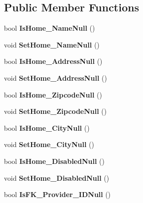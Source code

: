 \subsection*{Public Member Functions}
\begin{DoxyCompactItemize}
\item 
\mbox{\label{class_a_f_h___scheduler_1_1_home_inspection_db_data_set_1_1_home_row_ad3791247dcb190cc82cf0a80340b1a56}} 
bool {\bfseries Is\+Home\+\_\+\+Name\+Null} ()
\item 
\mbox{\label{class_a_f_h___scheduler_1_1_home_inspection_db_data_set_1_1_home_row_a62ccb79bfed5378f59b8f469e11d7f36}} 
void {\bfseries Set\+Home\+\_\+\+Name\+Null} ()
\item 
\mbox{\label{class_a_f_h___scheduler_1_1_home_inspection_db_data_set_1_1_home_row_adb0e6e28b75b6d6c6e02f45a41b537eb}} 
bool {\bfseries Is\+Home\+\_\+\+Address\+Null} ()
\item 
\mbox{\label{class_a_f_h___scheduler_1_1_home_inspection_db_data_set_1_1_home_row_a26b60a9f60bd48377bcba9a21a2f2f05}} 
void {\bfseries Set\+Home\+\_\+\+Address\+Null} ()
\item 
\mbox{\label{class_a_f_h___scheduler_1_1_home_inspection_db_data_set_1_1_home_row_ad17d157019ad9506791e4c4274511998}} 
bool {\bfseries Is\+Home\+\_\+\+Zipcode\+Null} ()
\item 
\mbox{\label{class_a_f_h___scheduler_1_1_home_inspection_db_data_set_1_1_home_row_acda96ceacbf591701381856f7455f217}} 
void {\bfseries Set\+Home\+\_\+\+Zipcode\+Null} ()
\item 
\mbox{\label{class_a_f_h___scheduler_1_1_home_inspection_db_data_set_1_1_home_row_a8efe0bfd42630d958121c567b9959730}} 
bool {\bfseries Is\+Home\+\_\+\+City\+Null} ()
\item 
\mbox{\label{class_a_f_h___scheduler_1_1_home_inspection_db_data_set_1_1_home_row_ae462481f3c082678aba2c7cb9f65b291}} 
void {\bfseries Set\+Home\+\_\+\+City\+Null} ()
\item 
\mbox{\label{class_a_f_h___scheduler_1_1_home_inspection_db_data_set_1_1_home_row_a482358f00ec0a136586e37848fc74dbb}} 
bool {\bfseries Is\+Home\+\_\+\+Disabled\+Null} ()
\item 
\mbox{\label{class_a_f_h___scheduler_1_1_home_inspection_db_data_set_1_1_home_row_a57235260bd3e0148c8146fee42925419}} 
void {\bfseries Set\+Home\+\_\+\+Disabled\+Null} ()
\item 
\mbox{\label{class_a_f_h___scheduler_1_1_home_inspection_db_data_set_1_1_home_row_af6e1ac934c0f4a2f982de35a69da7cd3}} 
bool {\bfseries Is\+F\+K\+\_\+\+Provider\+\_\+\+I\+D\+Null} ()

\end{DoxyCompactItemize}
